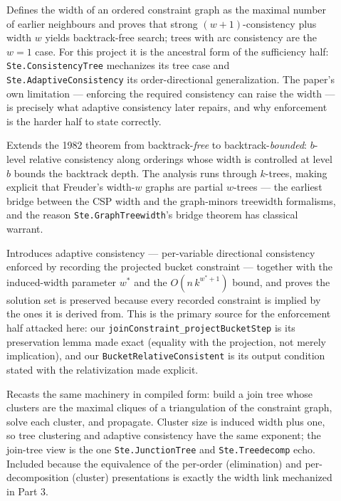 \documentclass[11pt]{article}
\newcommand{\ste}[1]{\texttt{#1}}
\begin{document}
\begin{description}

\item[\citet{freuder1982backtrack}] Defines the width of an ordered
constraint graph as the maximal number of earlier neighbours and
proves that strong $(w{+}1)$-consistency plus width $w$ yields
backtrack-free search; trees with arc consistency are the $w{=}1$
case. For this project it is the ancestral form of the sufficiency
half: \ste{Ste.ConsistencyTree} mechanizes its tree case and
\ste{Ste.AdaptiveConsistency} its order-directional generalization.
The paper's own limitation --- enforcing the required consistency can
raise the width --- is precisely what adaptive consistency later
repairs, and why enforcement is the harder half to state correctly.

\item[\citet{freuder1985backtrackBounded}] Extends the 1982 theorem
from backtrack-\emph{free} to backtrack-\emph{bounded}: $b$-level
relative consistency along orderings whose width is controlled at
level $b$ bounds the backtrack depth. The analysis runs through
$k$-trees, making explicit that Freuder's width-$w$ graphs are partial
$w$-trees --- the earliest bridge between the CSP width and the
graph-minors treewidth formalisms, and the reason
\ste{Ste.GraphTreewidth}'s bridge theorem has classical warrant.

\item[\citet{dechterpearl1987network}] Introduces adaptive consistency
--- per-variable directional consistency enforced by recording the
projected bucket constraint --- together with the induced-width
parameter $w^*$ and the $O(n\,k^{w^*+1})$ bound, and proves the
solution set is preserved because every recorded constraint is implied
by the ones it is derived from. This is the primary source for the
enforcement half attacked here: our
\ste{joinConstraint\_projectBucketStep} is its preservation lemma made
exact (equality with the projection, not merely implication), and our
\ste{BucketRelativeConsistent} is its output condition stated with the
relativization made explicit.

\item[\citet{dechterpearl1989tree}] Recasts the same machinery in
compiled form: build a join tree whose clusters are the maximal
cliques of a triangulation of the constraint graph, solve each
cluster, and propagate. Cluster size is induced width plus one, so
tree clustering and adaptive consistency have the same exponent; the
join-tree view is the one \ste{Ste.JunctionTree} and
\ste{Ste.Treedecomp} echo. Included because the equivalence of the
per-order (elimination) and per-decomposition (cluster) presentations
is exactly the width link mechanized in Part 3.


\end{description}
\end{document}
